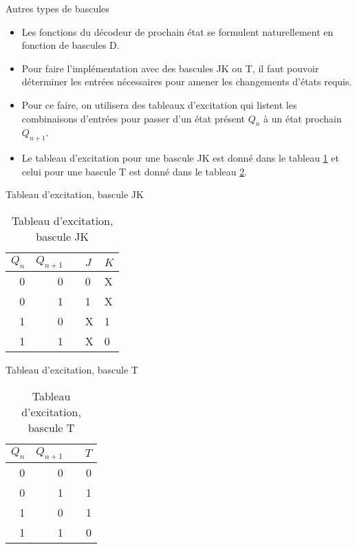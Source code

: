 \documentclass[presentation]{beamer}
\begin{document}
\begin{frame}[label={sec:org941577b}]{Autres types de bascules}
\begin{itemize}
\item Les fonctions du décodeur de prochain état se formulent naturellement en fonction de bascules D.

\item Pour faire l'implémentation avec des bascules JK ou T, il faut pouvoir déterminer les entrées nécessaires pour amener les changements d'états requis.

\item Pour ce faire, on utilisera des \alert{tableaux d'excitation} qui listent les combinaisons d'entrées pour passer d'un état présent \(Q_n\) à un état prochain \(Q_{n+1}\).

\item Le tableau d'excitation pour une bascule JK est donné dans le tableau \ref{tab:orgac04f10} et celui pour une bascule T est donné dans le tableau \ref{tab:orgaf34838}.
\end{itemize}
\end{frame}

\begin{frame}[label={sec:org7828573}]{Tableau d'excitation, bascule JK}
\begin{table}[htbp]
\caption{\label{tab:orgac04f10}Tableau d'excitation, bascule JK}
\centering
\begin{tabular}{rrlll}
\(Q_n\) & \(Q_{n+1}\) &  & \(J\) & \(K\)\\
\hline
0 & 0 &  & 0 & X\\
0 & 1 &  & 1 & X\\
1 & 0 &  & X & 1\\
1 & 1 &  & X & 0\\
\end{tabular}
\end{table}
\end{frame}

\begin{frame}[label={sec:org8991dbe}]{Tableau d'excitation, bascule T}
\begin{table}[htbp]
\caption{\label{tab:orgaf34838}Tableau d'excitation, bascule T}
\centering
\begin{tabular}{rrlr}
\(Q_n\) & \(Q_{n+1}\) &  & \(T\)\\
\hline
0 & 0 &  & 0\\
0 & 1 &  & 1\\
1 & 0 &  & 1\\
1 & 1 &  & 0\\
\end{tabular}
\end{table}
\end{frame}
\end{document}
